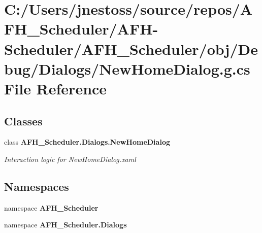 \section{C\+:/\+Users/jnestoss/source/repos/\+A\+F\+H\+\_\+\+Scheduler/\+A\+F\+H-\/\+Scheduler/\+A\+F\+H\+\_\+\+Scheduler/obj/\+Debug/\+Dialogs/\+New\+Home\+Dialog.g.\+cs File Reference}
\label{_debug_2_dialogs_2_new_home_dialog_8g_8cs}
\subsection*{Classes}
\begin{DoxyCompactItemize}
\item 
class \textbf{ A\+F\+H\+\_\+\+Scheduler.\+Dialogs.\+New\+Home\+Dialog}
\begin{DoxyCompactList}\small\item\em Interaction logic for New\+Home\+Dialog.\+xaml \end{DoxyCompactList}\end{DoxyCompactItemize}
\subsection*{Namespaces}
\begin{DoxyCompactItemize}
\item 
namespace \textbf{ A\+F\+H\+\_\+\+Scheduler}
\item 
namespace \textbf{ A\+F\+H\+\_\+\+Scheduler.\+Dialogs}
\end{DoxyCompactItemize}
